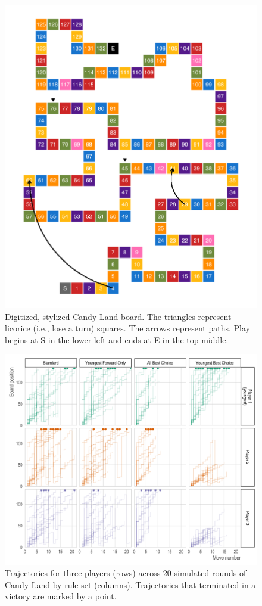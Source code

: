 \documentclass[letterpaper,9pt,twocolumn,twoside,]{pinp}
\begin{document}
\begin{figure}
  \begin{center}
    \includegraphics[width=4.5in]{./../../plots/p1_board.pdf}
    \caption{Digitized, stylized Candy Land board. The triangles represent licorice (i.e., lose a turn) squares. The arrows represent paths. Play begins at S in the lower left and ends at E in the top middle.}
    \label{fig:p1_board}
  \end{center}
\end{figure}

\begin{figure}
  \begin{center}
    \includegraphics[width=5in]{./../../plots/p_trajectories.pdf}
    \caption{Trajectories for three players (rows) across 20 simulated rounds of Candy Land by rule set (columns). Trajectories that terminated in a victory are marked by a point.}
    \label{fig:p_trajectories}
  \end{center}
\end{figure}

\end{document}
